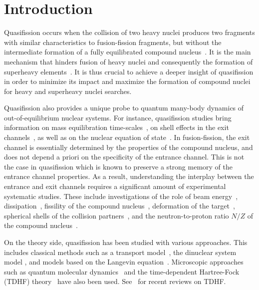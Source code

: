 
\section{Introduction}

Quasifission occurs when the collision of two heavy nuclei produces two fragments with similar characteristics to fusion-fission fragments, but without the intermediate formation of a fully equilibrated compound nucleus~\citep{heusch1978,back1981,back1983,bock1982}.
It is the main mechanism that hinders fusion of heavy nuclei and consequently the formation of
superheavy elements~\citep{sahm1984,gaggeler1984,schmidt1991,back2014,khuyagbaatar2018,banerjee2019}.
It is thus crucial to achieve a deeper insight of quasifission in order to minimize its impact and maximize the formation of compound nuclei for heavy and superheavy nuclei searches.

Quasifission also provides a unique probe to quantum many-body dynamics of out-of-equilibrium nuclear systems.
For instance, quasifission studies bring information on mass equilibration time-scales~\citep{toke1985,shen1987,durietz2011}, on shell effects in the exit channels~\citep{itkis2004,nishio2008,kozulin2014,wakhle2014,morjean2017}, as well as on the nuclear equation of state~\citep{veselsky2016,zheng2018}.
In fusion-fission, the exit channel is essentially determined by the properties of the compound nucleus, and does not depend a priori on the specificity of the entrance channel.
This is not the case in quasifission which is known to preserve a strong memory of the entrance channel properties.
As a result, understanding the interplay between the entrance and exit channels requires a significant amount of experimental systematic studies.
These include investigations of the role of beam energy~\citep{back1996,nishio2008,nishio2012}, dissipation~\citep{williams2018}, fissility of the compound nucleus~\citep{lin2012,durietz2013},
deformation of the target~\citep{hinde1995,hinde1996,knyazheva2007,hinde2008,nishio2008},
spherical shells of the collision partners~\citep{simenel2012b,mohanto2018}, and the neutron-to-proton ratio
$N/Z$ of the compound nucleus~\citep{hammerton2015,hammerton2019}.

On the theory side, quasifission has been studied with various approaches.
This includes classical methods such as
a transport model~\citep{diaz-torres2001}, the dinuclear system model \citep{adamian2003,huang2010,bao2015,guo2018c}, and models based on the Langevin equation~\citep{zagrebaev2005,aritomo2009,aritomo2012,karpov2017,sekizawa2019b}.
Microscopic approaches such as quantum molecular dynamics~\citep{wen2013,wang2016,zhao2016} and the
time-dependent Hartree-Fock (TDHF) theory~\citep{golabek2009,kedziora2010,wakhle2014,oberacker2014,hammerton2015,umar2015a,umar2016,sekizawa2016,yu2017,ayik2017,ayik2018,sekizawa2017a,wakhle2018,morjean2017,sekizawa2019b} have also been used. See~\citep{simenel2012,simenel2018,sekizawa2019,stevenson2019} for recent reviews on TDHF.

